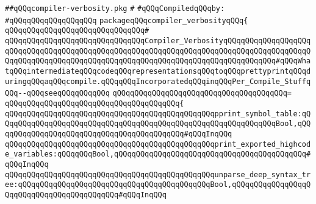 \label{src/lib/compiler/front/basics/main/compiler-verbosity.pkg}
\verb|##qQQqcompiler-verbosity.pkg|\newline
\verb|#|\newline
\newline
\verb|#qQQqCompiledqQQqby:|\newline
\verb|#qQQqqQQqqQQqqQQqqQQq|\newline
\newline
\verb|packageqQQqcompiler_verbosityqQQq{|\newline
\verb|qQQqqQQqqQQqqQQqqQQqqQQqqQQqqQQq#|\newline
\verb|qQQqqQQqqQQqqQQqqQQqqQQqqQQqqQQqCompiler_VerbosityqQQqqQQqqQQqqQQqqQQqqQQqqQQqqQQqqQQqqQQqqQQqqQQqqQQqqQQqqQQqqQQqqQQqqQQqqQQqqQQqqQQqqQQqqQQqqQQqqQQqqQQqqQQqqQQqqQQqqQQqqQQqqQQqqQQqqQQqqQQqqQQqqQQqqQQq#qQQqWhatqQQqintermediateqQQqcodeqQQqrepresentationsqQQqtoqQQqprettyprintqQQqduringqQQqaqQQqcompile.qQQqqQQqIncorporatedqQQqinqQQqPer_Compile_StuffqQQq--qQQqseeqQQqqQQqqQQq|\newline
\verb|qQQqqQQqqQQqqQQqqQQqqQQqqQQqqQQqqQQqqQQq=|\newline
\verb|qQQqqQQqqQQqqQQqqQQqqQQqqQQqqQQqqQQqqQQq{|\newline
\verb|qQQqqQQqqQQqqQQqqQQqqQQqqQQqqQQqqQQqqQQqqQQqqQQqpprint_symbol_table:qQQqqQQqqQQqqQQqqQQqqQQqqQQqqQQqqQQqqQQqqQQqqQQqqQQqqQQqqQQqqQQqBool,qQQqqQQqqQQqqQQqqQQqqQQqqQQqqQQqqQQqqQQqqQQq#qQQqInqQQq|\newline
\verb|qQQqqQQqqQQqqQQqqQQqqQQqqQQqqQQqqQQqqQQqqQQqqQQqprint_exported_highcode_variables:qQQqqQQqBool,qQQqqQQqqQQqqQQqqQQqqQQqqQQqqQQqqQQqqQQqqQQq#qQQqInqQQq|\newline
\verb|qQQqqQQqqQQqqQQqqQQqqQQqqQQqqQQqqQQqqQQqqQQqqQQqunparse_deep_syntax_tree:qQQqqQQqqQQqqQQqqQQqqQQqqQQqqQQqqQQqqQQqqQQqBool,qQQqqQQqqQQqqQQqqQQqqQQqqQQqqQQqqQQqqQQqqQQq#qQQqInqQQq|\newline
